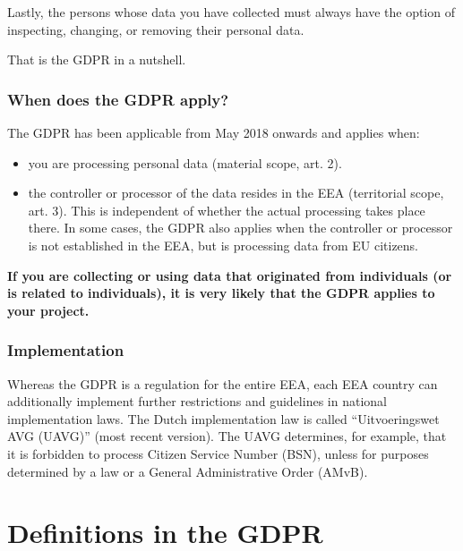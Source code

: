 \documentclass[
]{book}
\providecommand{\tightlist}{%
  \setlength{\itemsep}{0pt}\setlength{\parskip}{0pt}}
\begin{document}
Lastly, the persons whose data you have collected must always have the option of inspecting, changing, or removing their personal data.

That is the GDPR in a nutshell.

\hypertarget{when-does-the-gdpr-apply}{%
\subsubsection{When does the GDPR apply?}\label{when-does-the-gdpr-apply}}

The GDPR has been applicable from May 2018 onwards and applies when:

\begin{itemize}
\tightlist
\item
  you are processing personal data (material scope, art. 2).
\item
  the controller or processor of the data resides in the EEA (territorial scope, art. 3). This is independent of whether the actual processing takes place there. In some cases, the GDPR also applies when the controller or processor is not established in the EEA, but is processing data from EU citizens.
\end{itemize}

\textbf{If you are collecting or using data that originated from individuals (or is related to individuals), it is very likely that the GDPR applies to your project.}

\hypertarget{implementation}{%
\subsubsection{Implementation}\label{implementation}}

Whereas the GDPR is a regulation for the entire EEA, each EEA country can additionally implement further restrictions and guidelines in national implementation laws. The Dutch implementation law is called ``Uitvoeringswet AVG (UAVG)'' (most recent version). The UAVG determines, for example, that it is forbidden to process Citizen Service Number (BSN), unless for purposes determined by a law or a General Administrative Order (AMvB).

\hypertarget{definitions}{%
\section*{Definitions in the GDPR}\label{definitions}}
\end{document}
